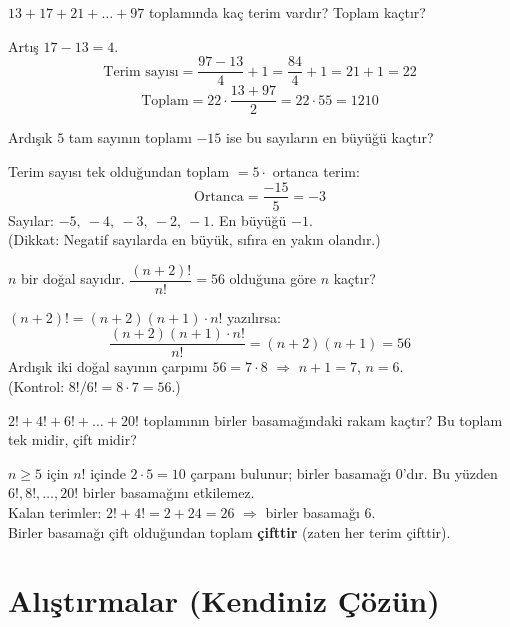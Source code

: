\begin{alistirma}
\(13+17+21+\dots+97\) toplamında kaç terim vardır? Toplam kaçtır?
\end{alistirma}
\begin{cozum}
Artış \(17-13=4\).
\[\text{Terim sayısı}=\frac{97-13}{4}+1=\frac{84}{4}+1=21+1=22\]
\[\text{Toplam}=22\cdot\frac{13+97}{2}=22\cdot 55=1210\]
\end{cozum}

\begin{alistirma}
Ardışık \(5\) tam sayının toplamı \(-15\) ise bu sayıların en büyüğü kaçtır?
\end{alistirma}
\begin{cozum}
Terim sayısı tek olduğundan toplam \(=5\cdot\) ortanca terim:
\[\text{Ortanca}=\frac{-15}{5}=-3\]
Sayılar: \(-5,\ -4,\ -3,\ -2,\ -1\). \quad En büyüğü \(-1\).\\
(Dikkat: Negatif sayılarda en büyük, sıfıra en yakın olandır.)
\end{cozum}

\begin{alistirma}
\(n\) bir doğal sayıdır. \(\dfrac{(n+2)!}{n!}=56\) olduğuna göre \(n\) kaçtır?
\end{alistirma}
\begin{cozum}
\((n+2)!=(n+2)(n+1)\cdot n!\) yazılırsa:
\[\frac{(n+2)(n+1)\cdot n!}{n!}=(n+2)(n+1)=56\]
Ardışık iki doğal sayının çarpımı \(56=7\cdot 8\) \(\Rightarrow\) \(n+1=7\), \(n=6\).\\
(Kontrol: \(8!/6!=8\cdot 7=56\).)
\end{cozum}

\begin{alistirma}
\(2!+4!+6!+\dots+20!\) toplamının birler basamağındaki rakam kaçtır? Bu toplam tek midir, çift midir?
\end{alistirma}
\begin{cozum}
\(n\ge 5\) için \(n!\) içinde \(2\cdot 5=10\) çarpanı bulunur; birler basamağı \(0\)'dır. Bu yüzden \(6!,8!,\dots,20!\) birler basamağını etkilemez.\\
Kalan terimler: \(2!+4!=2+24=26\) \(\Rightarrow\) birler basamağı \(6\).\\
Birler basamağı çift olduğundan toplam \textbf{çifttir} (zaten her terim çifttir).
\end{cozum}

\kendinizoncesi
\section{Alıştırmalar (Kendiniz Çözün)}

